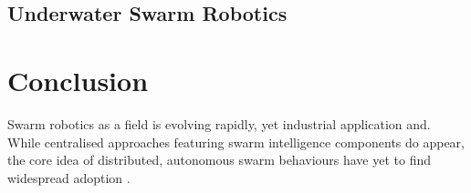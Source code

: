 \documentclass{article}
\begin{document}
\subsection{Underwater Swarm Robotics}
\cite{underwaterSR}

\section{Conclusion}
Swarm robotics as a field is evolving rapidly, yet industrial application and. While centralised approaches featuring swarm intelligence components do appear, the core idea of distributed, autonomous swarm behaviours have yet to find widespread adoption \cite{SwarmIntelligenceOptimisation}.

\newpage
\printbibliography



	
	
\end{document}
